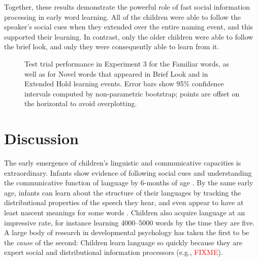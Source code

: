 \documentclass{pnastwo}
\newcommand{\red}[1]{\textcolor{red}{#1}}
\begin{document}
\begin{article}

Together, these results demonstrate the powerful role of fast social information processing in early word learning. All of the children were able to follow the speaker's social cues when they extended over the entire naming event, and this supported their learning. In contrast, only the older children were able to follow the brief look, and only they were consequently able to learn from it. 

\begin{figure}[tb]
	\caption{Test trial performance in Experiment 3 for the Familiar words, as well as for Novel words that appeared in Brief Look and in Extended Hold learning events. Error bars show 95\% confidence intervals computed by non-parametric bootstrap; points are offset on the horizontal to avoid overplotting.}
	\label{fig:soc_word_test} 
\end{figure}

\section{Discussion}

The early emergence of children's linguistic and communicative capacities is extraordinary. Infants show evidence of following social cues and understanding the communicative function of language by 6-months of age \cite{senju2008, vouloumanos2014}. By the same early age, infants can learn about the structure of their languages by tracking the distributional properties of the speech they hear, and even appear to have at least nascent meanings for some words \cite{thiessen2003, bergelson2012}. Children also acquire language at an impressive rate, for instance learning 4000--5000 words \cite{goulden1990} by the time they are five. A large body of research in developmental psychology has taken the first to be the \emph{cause} of the second: Children learn language so quickly because they are expert social and distributional information processors (e.g., \red{FIXME}).


\end{article}
\end{document}
